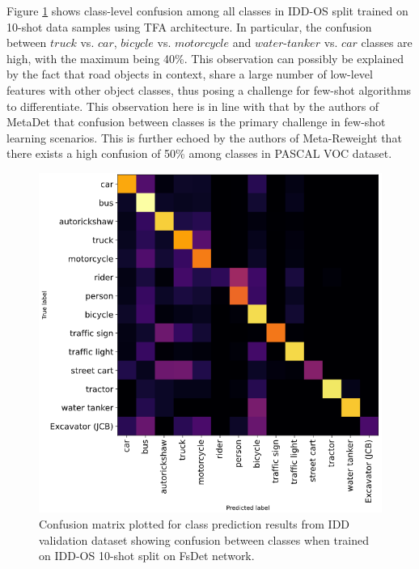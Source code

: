 \documentclass[letterpaper]{article} %
\begin{document}
Figure \ref{confmatrix} shows class-level confusion among all classes in IDD-OS split trained on 10-shot data samples using TFA architecture. In particular, the confusion between $truck$ vs. $car$, $bicycle$ vs. $motorcycle$ and $water$-$tanker$ vs. $car$ classes are high, with the maximum being 40\%. This observation can possibly be explained by the fact that road objects in context, share a large number of low-level features with other object classes, thus posing a challenge for few-shot algorithms to differentiate. This observation here is in line with that by the authors of MetaDet \cite{metadet} that confusion between classes is the primary challenge in few-shot learning scenarios. This is further echoed by the authors of Meta-Reweight \cite{reweight} that there exists a high confusion of 50\% among classes in PASCAL VOC dataset.

\begin{figure}[t]
\centering
\includegraphics[width=0.95\columnwidth]{confusion_matrix}
\caption{Confusion matrix plotted for class prediction results from IDD validation dataset showing confusion between classes when trained on IDD-OS 10-shot split on FsDet network.}
\label{confmatrix}
\end{figure}

\vspace{-1.02mm}
\end{document}
